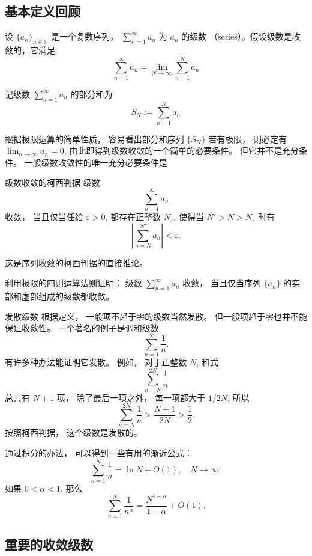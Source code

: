 

\subsection{基本定义回顾}


设 $\{a_n\}_{n\in\mathbb{N}}$ 是一个复数序列， $\sum_{n=1}^\infty a_n$ 为 $a_n$ 的级数 （series）。假设级数是收敛的，它满足
$$
\sum_{n=1}^\infty a_n = \lim_{N \to \infty} \sum_{n=1}^N a_n
$$

记级数 $\sum_{n=1}^\infty a_n$ 的部分和为
\[
S_N := \sum_{n=1}^N a_n
\]

根据极限运算的简单性质， 容易看出部分和序列 $\{S_N\}$ 若有极限， 则必定有 $\lim_{n\to\infty}a_n=0$, 由此即得到级数收敛的一个简单的必要条件。 但它并不是充分条件。 一般级数收敛性的唯一充分必要条件是
\begin{theorem}{级数收敛的柯西判据}
级数
\[
\sum_{n=1}^\infty a_n
\]
收敛， 当且仅当任给 $\varepsilon>0$, 都存在正整数 $N_\varepsilon$, 使得当 $N'>N>N_\varepsilon$ 时有
$$
\left|\sum_{n=N}^{N'} a_n\right|<\varepsilon.
$$
\end{theorem}
这是序列收敛的柯西判据的直接推论。

\begin{exercise}{}
利用极限的四则运算法则证明： 级数 $\sum_{n=1}^\infty a_n$ 收敛， 当且仅当序列 $\{a_n\}$ 的实部和虚部组成的级数都收敛。
\end{exercise}

\begin{example}{发散级数}
根据定义， 一般项不趋于零的级数当然发散。 但一般项趋于零也并不能保证收敛性。 一个著名的例子是调和级数
$$
\sum_{n=1}^\infty\frac{1}{n}.
$$
有许多种办法能证明它发散。 例如， 对于正整数 $N$, 和式
$$
\sum_{n=N}^{2N}\frac{1}{n}
$$
总共有 $N+1$ 项， 除了最后一项之外， 每一项都大于 $1/2N$, 所以
$$
\sum_{n=N}^{2N}\frac{1}{n}>\frac{N+1}{2N}>\frac{1}{2}.
$$
按照柯西判据， 这个级数是发散的。

通过积分的办法， 可以得到一些有用的渐近公式：
$$
\sum_{n=1}^{N}\frac{1}{n}=\ln N+O(1),\quad N\to\infty;
$$
如果 $0<\alpha<1$, 那么
$$
\sum_{n=1}^{N}\frac{1}{n^\alpha}=\frac{N^{1-\alpha}}{1-\alpha}+O(1).
$$
\end{example}

\subsection{重要的收敛级数}

